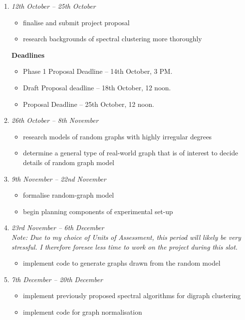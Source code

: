 \documentclass[a4paper,12pt]{article}
\begin{document}
\begin{enumerate}
 \item 
 \emph{12th October -- 25th October} 
 \begin{itemize}
	\item finalise and submit project proposal
	\item research backgrounds of spectral clustering more thoroughly
 \end{itemize}
 
 \textbf{Deadlines}
 \begin{itemize}
  \item 
  Phase 1 Proposal Deadline -- 14th October, 3 PM.
  \item
  Draft Proposal deadline -- 18th October, 12 noon.
  \item
  Proposal Deadline -- 25th October, 12 noon.
 \end{itemize}
 
 \item 
 \emph{26th October -- 8th November}
 \begin{itemize}
	\item research models of random graphs with highly irregular degrees
	\item determine a general type of real-world graph that is of interest to decide details of
	random graph model
 \end{itemize}
 
 \item 
 \emph{9th November -- 22nd November}
 	\begin{itemize}
		\item formalise random-graph model
		\item begin planning components of experimental set-up
	\end{itemize}
 \item 
 \emph{23rd November -- 6th December} \\ \textit{Note: Due to my choice of Units of Assessment, this 
 period will likely be very stressful. I therefore foresee less time to work on the project during 
 this slot.}
 \begin{itemize}
	\item implement code to generate graphs drawn from the random model
 \end{itemize}
 
 \item 
 \emph{7th December -- 20th December}
 \begin{itemize}
	\item implement previously proposed spectral algorithms for digraph clustering
	\item implement code for graph normalisation
 \end{itemize}
 

\end{enumerate}
\end{document}
